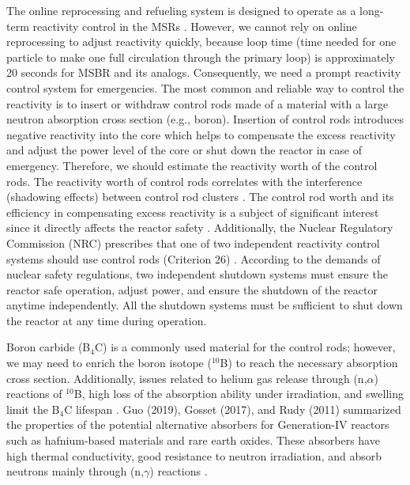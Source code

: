 The online reprocessing and refueling system is designed to operate as a long-term reactivity control in the MSRs \cite{ashraf2019modeling,ashraf2019Preliminary}. However, we cannot rely on online reprocessing to adjust reactivity quickly, because loop time (time needed for one particle to make one full circulation through the primary loop) is approximately 20 seconds for MSBR and its analogs. Consequently, we need a prompt reactivity control system for emergencies. The most common and reliable way to control the reactivity is to insert or withdraw control rods made of a material with a large neutron absorption cross section (e.g., boron).
Insertion of control rods introduces negative reactivity into the 
core which helps to compensate the excess reactivity and 
adjust the power level of the core or shut down the reactor in case of 
emergency. Therefore, we should estimate 
the reactivity worth of the control rods.
The reactivity worth of control rods correlates with the interference 
(shadowing effects) between control rod clusters 
\cite{vcerba2017optimization}. 
The control rod worth and its efficiency in compensating excess reactivity is a subject of significant interest since it directly affects the reactor safety \cite{atkinson2019small}. Additionally, the Nuclear Regulatory Commission (NRC) prescribes that one of two independent reactivity control systems should use control rods (Criterion 26) \cite{nuclear1987standard}. According to the demands of nuclear safety regulations, two independent shutdown systems must ensure the reactor safe operation, adjust power, and ensure the shutdown of the reactor anytime independently. All the shutdown systems must be sufficient to shut down the reactor at any time during operation.

Boron carbide (B$_4$C) is a commonly used material for the control rods; 
however, we may need to enrich the boron isotope ($^{10}$B) to reach 
the necessary absorption cross section. Additionally, issues related to helium gas release through (n,$\alpha$) reactions of $^{10}$B, high loss of the absorption ability under irradiation, and swelling limit the B$_4$C lifespan 
\cite{guo2019optimized}. Guo (2019), Gosset (2017), and Rudy (2011) summarized the properties of the 
potential alternative absorbers for Generation-IV reactors such as 
hafnium-based materials and rare earth oxides. These absorbers have 
high thermal conductivity, good resistance to neutron irradiation, and
absorb neutrons mainly through (n,$\gamma$) reactions
\cite{guo2019optimized}.

